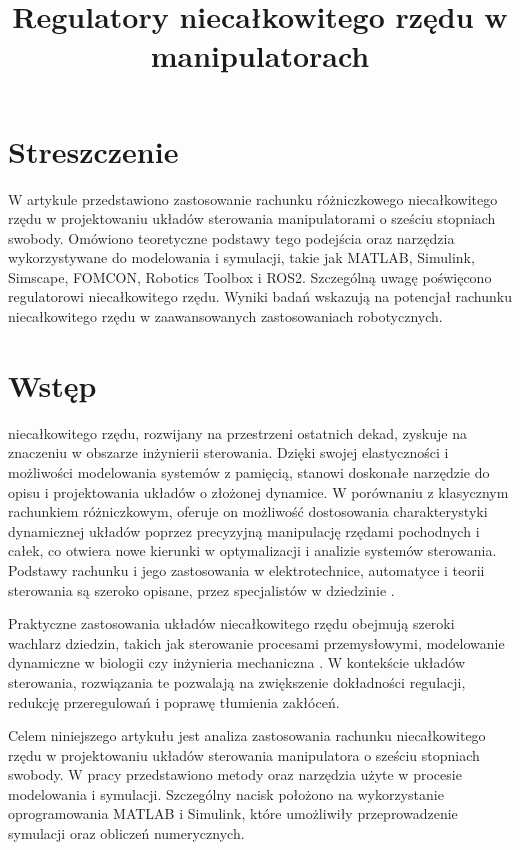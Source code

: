 \documentclass[journal,twoside,web]{ieeecolor}
\begin{document}
\title{Regulatory niecałkowitego rzędu w manipulatorach}

\author{}

\maketitle
\onehalfspacing

\section{Streszczenie}
W artykule przedstawiono zastosowanie rachunku różniczkowego niecałkowitego rzędu w projektowaniu układów sterowania manipulatorami o sześciu stopniach swobody. Omówiono teoretyczne podstawy tego podejścia oraz narzędzia wykorzystywane do modelowania i symulacji, takie jak MATLAB, Simulink, Simscape, FOMCON, Robotics Toolbox i ROS2. Szczególną uwagę poświęcono regulatorowi niecałkowitego rzędu. Wyniki badań wskazują na potencjał rachunku niecałkowitego rzędu w zaawansowanych zastosowaniach robotycznych.

\section{Wstęp}
\label{sec:introduction}
 niecałkowitego rzędu, rozwijany na przestrzeni ostatnich dekad, zyskuje na znaczeniu w obszarze inżynierii sterowania. Dzięki swojej elastyczności i możliwości modelowania systemów z pamięcią, stanowi doskonałe narzędzie do opisu i projektowania układów o złożonej dynamice. W porównaniu z klasycznym rachunkiem różniczkowym, oferuje on możliwość dostosowania charakterystyki dynamicznej układów poprzez precyzyjną manipulację rzędami pochodnych i całek, co otwiera nowe kierunki w optymalizacji i analizie systemów sterowania. Podstawy rachunku i jego zastosowania w elektrotechnice, automatyce i teorii sterowania są szeroko opisane, przez specjalistów w dziedzinie \cite{Fractional, Selected, Pawlusz, Popolizio}.  

Praktyczne zastosowania układów niecałkowitego rzędu obejmują szeroki wachlarz dziedzin, takich jak sterowanie procesami przemysłowymi, modelowanie dynamiczne w biologii czy inżynieria mechaniczna \cite{Kumar, plant, falling, power}. W kontekście układów sterowania, rozwiązania te pozwalają na zwiększenie dokładności regulacji, redukcję przeregulowań i poprawę tłumienia zakłóceń.

Celem niniejszego artykułu jest analiza zastosowania rachunku niecałkowitego rzędu w projektowaniu układów sterowania manipulatora o sześciu stopniach swobody. W pracy przedstawiono metody oraz narzędzia użyte w procesie modelowania i symulacji. Szczególny nacisk położono na wykorzystanie oprogramowania MATLAB i Simulink, które umożliwiły przeprowadzenie symulacji oraz obliczeń numerycznych.
\end{document}
